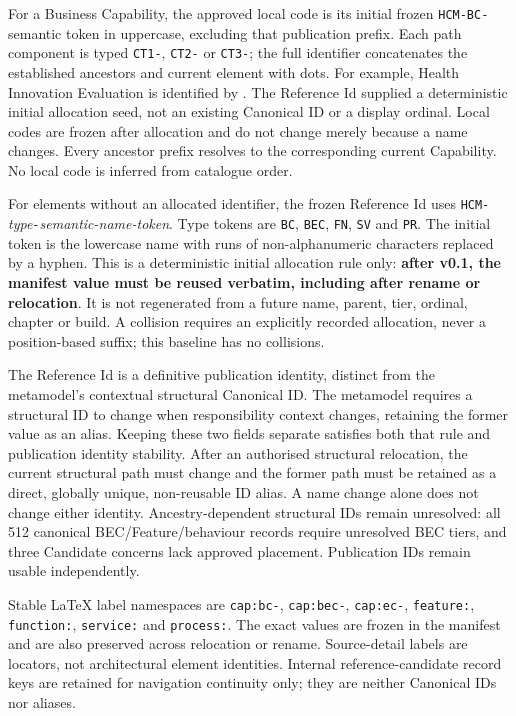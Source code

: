 For a Business Capability, the approved local code is its initial frozen
\texttt{HCM-BC-} semantic token in uppercase, excluding that publication prefix.
Each path component is typed \texttt{CT1-}, \texttt{CT2-} or \texttt{CT3-}; the full
identifier concatenates the established ancestors and current element with dots.
For example, Health Innovation Evaluation is identified by
\texttt{}.
The Reference Id supplied a deterministic initial allocation seed, not an existing
Canonical ID or a display ordinal. Local codes are frozen after allocation and do
not change merely because a name changes. Every ancestor prefix resolves to the
corresponding current Capability. No local code is inferred from catalogue order.

For elements without an allocated identifier, the frozen Reference Id uses
\texttt{HCM-}\emph{type}\texttt{-}\emph{semantic-name-token}. Type tokens are
\texttt{BC}, \texttt{BEC}, \texttt{FN}, \texttt{SV} and \texttt{PR}.
The initial token is the lowercase name with runs of non-alphanumeric characters
replaced by a hyphen. This is a deterministic initial allocation rule only:
\textbf{after v0.1, the manifest value must be reused verbatim, including after
rename or relocation}. It is not regenerated from a future name, parent, tier,
ordinal, chapter or build. A collision requires an explicitly recorded allocation,
never a position-based suffix; this baseline has no collisions.

The Reference Id is a definitive publication identity, distinct from the metamodel's
contextual structural Canonical ID. The metamodel requires a structural ID to change
when responsibility context changes, retaining the former value as an alias.
Keeping these two fields separate satisfies both that rule and publication identity
stability. After an authorised structural relocation, the current structural path
must change and the former path must be retained as a direct, globally unique,
non-reusable ID alias. A name change alone does not change either identity.
Ancestry-dependent structural IDs remain unresolved: all 512 canonical
BEC/Feature/behaviour records require unresolved BEC tiers, and three Candidate
concerns lack approved placement. Publication IDs remain usable independently.

Stable LaTeX label namespaces are \texttt{cap:bc-}, \texttt{cap:bec-},
\texttt{cap:ec-}, \texttt{feature:}, \texttt{function:}, \texttt{service:}
and \texttt{process:}. The exact values are frozen in the manifest and are also
preserved across relocation or rename. Source-detail labels are locators, not
architectural element identities. Internal reference-candidate record keys are
retained for navigation continuity only; they are neither Canonical IDs nor aliases.

